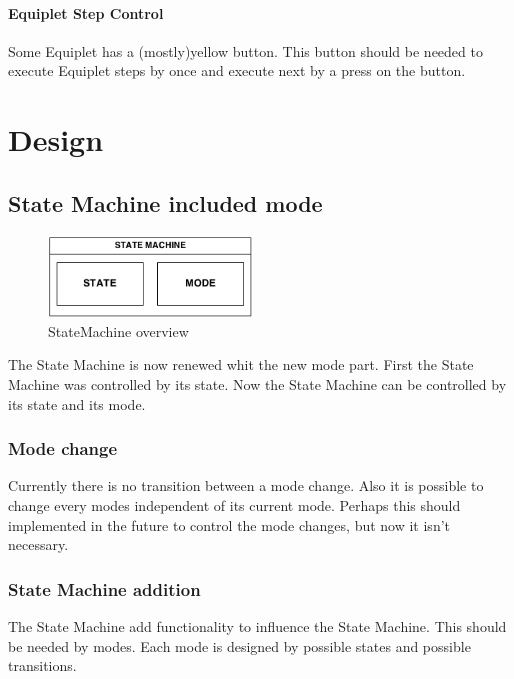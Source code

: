 \documentclass[12pt,a4paper]{report}
\begin{document}
\subsubsection{Equiplet Step Control}
Some Equiplet has a (mostly)yellow button. This button should be needed to execute Equiplet steps by once and execute next by a press on the button.

\chapter{Design}
\section{State Machine included mode}
\begin{figure}
  \vspace{-30pt}
  \begin{center}
    \includegraphics[width=0.48\textwidth]{pictures/StateMachine_mode.png}
  \end{center}
  \vspace{-20pt}
  \caption{StateMachine overview}
  \vspace{-10pt}
\end{figure}
The State Machine is now renewed whit the new mode part. First the State Machine was controlled by its state. Now the State Machine can be controlled by its state and its mode.

\subsection{Mode change}
Currently there is no transition between a mode change. Also it is possible to change every modes independent of its current mode. Perhaps this should implemented in the future to control the mode changes, but now it isn't necessary.

\subsection{State Machine addition}
The State Machine add functionality to influence the State Machine. This should be needed by modes. Each mode is designed by possible states and possible transitions.
\end{document}

